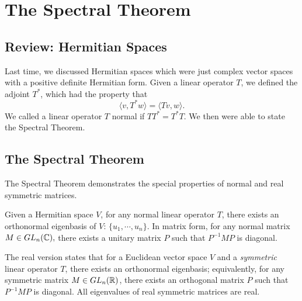 
\section{The Spectral Theorem}

\subsection{Review: Hermitian Spaces}
Last time, we discussed Hermitian spaces which were just complex vector spaces with a positive definite Hermitian form.  
Given a linear operator $T$, we defined the adjoint $T^*$, which had the property that \[\langle v, T^* w \rangle = \langle Tv, w\rangle. \]
We called a linear operator $T$ normal if $TT^* = T^* T$. 
We then were able to state the Spectral Theorem.

\subsection{The Spectral Theorem}

The Spectral Theorem demonstrates the special properties of normal and real symmetric matrices.
\begin{theorem}
Given a Hermitian space $V$, for any normal linear operator $T$, there exists an orthonormal eigenbasis of $V$: $\{u_1, \cdots, u_n\}.$ In matrix form, for any normal matrix $M \in GL_n(\mathbb C),$ there exists a unitary matrix $P$ such that $P^{-1} M P$ is diagonal.


The real version states that for a Euclidean vector space $V$ and a \emph{symmetric} linear operator $T$, there exists an orthonormal eigenbasis; equivalently, for any symmetric matrix $M \in GL_n(\mathbb R)$, there exists an orthogonal matrix $P$ such that $P^{-1}MP$ is diagonal. All eigenvalues of real symmetric matrices are real.
\end{theorem}

